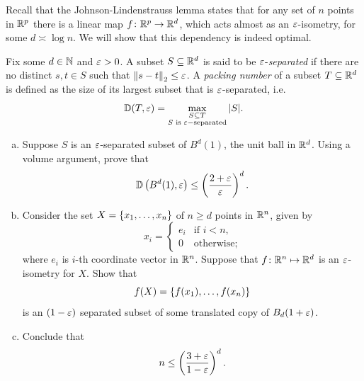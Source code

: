 \begin{myexercise}
    \label{prob:optimality_jl}
    Recall that the Johnson-Lindenstrauss lemma states that for any set of $n$ points in $\mathbb{R}^p$ there is a linear map $f\colon \mathbb{R}^p \to \mathbb{R}^d$, which acts almost as an $\varepsilon$-isometry, for some $d \asymp \log n$. We will show that this dependency is indeed optimal.
    
    Fix some $d \in \mathbb{N}$ and $\varepsilon > 0$. A subset $S \subseteq \mathbb{R}^d$ is said to be $\varepsilon$-\textit{separated} if there are no distinct $s, t \in S$ such that ${\left\lVert{s-t}\right\rVert}_2\leq\varepsilon$. A \textit{packing number} of a subset $T \subseteq \mathbb{R}^d$ is defined as the size of its largest subset that is $\varepsilon$-separated, i.e.
    \begin{equation*}
        \mathbb{D}(T, \varepsilon) = \max_{\substack{S \subseteq T \\ S \text{ is } \varepsilon-\text{separated}}} |S|.
    \end{equation*}
    \begin{enumerate}[(a)]
        \item Suppose $S$ is an $\varepsilon$-separated subset of $B^d(1)$, the unit ball in $\mathbb{R}^d$. Using a volume argument, prove that
        \begin{equation*}
            \mathbb{D}\left( B^d(1), \varepsilon \right) \leq \left( \frac{2+\varepsilon}{\varepsilon} \right)^d.
        \end{equation*}

        \item Consider the set $X = \left\{ x_1,\ldots,x_n \right\}$ of $n \geq d$ points in $\mathbb{R}^n$, given by
        \begin{equation*}
            x_i = \begin{cases}
                e_i &\text{if }i < n,\\
                0 &\text{otherwise};
            \end{cases}
        \end{equation*}
        where $e_i$ is $i$-th coordinate vector in $\mathbb{R}^n$. Suppose that $f\colon\mathbb{R}^n\mapsto\mathbb{R}^d$ is an $\varepsilon$-isometry for $X$. Show that 
        \begin{equation*}
            f(X) = \left\{ f(x_1), \ldots, f(x_n) \right\}
        \end{equation*}
        is an $(1-\varepsilon)$ separated subset of some translated copy of $B_d(1+\varepsilon)$.

        \item Conclude that
        \begin{equation*}
            n \leq \left( \frac{3+\varepsilon}{1-\varepsilon} \right)^d.
        \end{equation*}
    \end{enumerate}
\end{myexercise}

